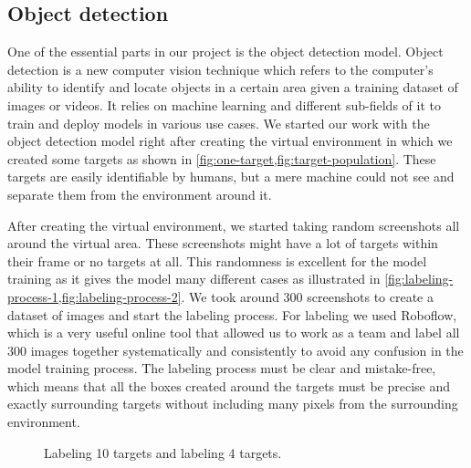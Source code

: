 \documentclass[../main.tex]{subfiles}
\begin{document}
\subsection{Object detection}\label{sec:obj-detection}
%
%
One of the essential parts in our project is the object
detection model. Object detection is a new computer vision
technique which refers to the computer's ability to 
identify and locate objects in a certain area given a training dataset 
of images or videos. It relies on machine learning and different 
sub-fields of it to train and deploy models in various use cases. 
We started our work with the object detection model right 
after creating the virtual environment in which we created
some targets as shown 
in \cref{fig:one-target,fig:target-population}. These 
targets are easily identifiable by humans, but a mere
machine could not see and separate them from the 
environment around it.
 
After creating the virtual environment, we started taking random 
screenshots all around the virtual area. These screenshots 
might have a lot of targets within their frame or no targets at all. 
This randomness is excellent for the model training as it gives the 
model many different cases as illustrated in 
\cref{fig:labeling-process-1,fig:labeling-process-2}.
We took around 300 screenshots to create a dataset of images and
start the labeling process. For labeling we used Roboflow, which is a 
very useful online tool that allowed us to work as a team and label all
300 images together systematically and consistently to avoid any 
confusion in the model training process. The labeling process must be 
clear and mistake-free, which means that all the boxes created around 
the targets must be precise and exactly surrounding targets without 
including many pixels from the surrounding environment.

\begin{figure}[tbp]%
	\centering
	\hspace{0.5cm}
	\caption{%
		\protect{} 
		Labeling 10 targets and
		\protect{} 
		labeling 4 targets.}%
	\label{fig:labeling-targets}%
\end{figure}
\end{document}
